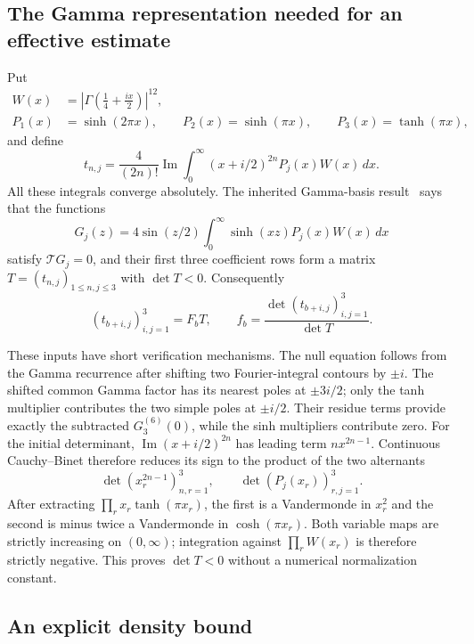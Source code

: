 \documentclass[11pt,a4paper]{article}
\theoremstyle{definition}
\theoremstyle{remark}
\numberwithin{equation}{section}
\begin{document}
\subsection{The Gamma representation needed for an effective estimate}

Put
\begin{align*}
 W(x)&=\left|\Gamma\!\left(\tfrac14+\tfrac{ix}{2}\right)\right|^{12},\\
 P_1(x)&=\sinh(2\pi x),\qquad
 P_2(x)=\sinh(\pi x),\qquad
 P_3(x)=\tanh(\pi x),
\end{align*}
and define
\begin{equation}\label{gs:t}
 t_{n,j}=\frac4{(2n)!}\operatorname{Im}
           \int_0^\infty(x+i/2)^{2n}P_j(x)W(x)\,dx.
\end{equation}
All these integrals converge absolutely.  The inherited Gamma-basis
result~\cite[Section~8, Gamma basis and positive normalization]{OrderedIncoming}
says that the functions
\[
 G_j(z)=4\sin(z/2)\int_0^\infty\sinh(xz)P_j(x)W(x)\,dx
\]
satisfy $\mathcal T G_j=0$, and their first three coefficient rows
form a matrix $T=(t_{n,j})_{1\le n,j\le3}$ with $\det T<0$.
Consequently
\begin{equation}\label{gs:Gamma-bridge}
 (t_{b+i,j})_{i,j=1}^3=F_bT,\qquad
 f_b=\frac{\det(t_{b+i,j})_{i,j=1}^3}{\det T}.
\end{equation}

These inputs have short verification mechanisms.  The null equation
follows from the Gamma recurrence after shifting two Fourier-integral
contours by $\pm i$.  The shifted common Gamma factor has its nearest
poles at $\pm3i/2$; only the tanh multiplier contributes the two
simple poles at $\pm i/2$.  Their residue terms provide exactly the
subtracted $G_3^{(6)}(0)$, while the sinh multipliers contribute zero.
For the initial determinant, $\operatorname{Im}(x+i/2)^{2n}$ has
leading term $nx^{2n-1}$.  Continuous Cauchy--Binet therefore reduces
its sign to the product of the two alternants
\[
 \det(x_r^{2n-1})_{n,r=1}^3,
 \qquad \det(P_j(x_r))_{r,j=1}^3.
\]
After extracting $\prod_r x_r\tanh(\pi x_r)$, the first is a
Vandermonde in $x_r^2$ and the second is minus twice a Vandermonde
in $\cosh(\pi x_r)$.  Both variable maps are strictly increasing
on $(0,\infty)$; integration against $\prod_rW(x_r)$ is therefore
strictly negative.  This proves $\det T<0$ without a numerical
normalization constant.

\subsection{An explicit density bound}
\end{document}
